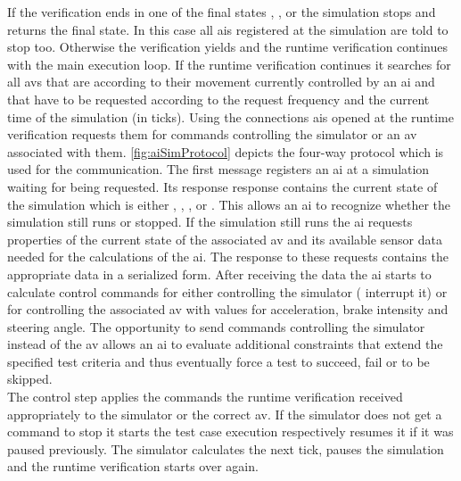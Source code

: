 If the verification ends in one of the final states , ,  or  the simulation stops and returns the final state.
In this case all \glspl{ai} registered at the simulation are told to stop too.
Otherwise the verification yields  and the runtime verification continues with the main execution loop.
If the runtime verification continues it searches for all \glspl{av} that are according to their movement currently controlled by an \gls{ai} and that have to be requested according to the request frequency and the current time of the simulation (in ticks).
Using the connections \glspl{ai} opened at \drivebuild{} the runtime verification requests them for commands controlling the simulator or an \gls{av} associated with them.
\autoref{fig:aiSimProtocol} depicts the four-way protocol which is used for the communication.
The first message registers an \gls{ai} at a simulation waiting for being requested.
Its response response contains the current state of the simulation which is either , , ,  or .
This allows an \gls{ai} to recognize whether the simulation still runs or stopped.
If the simulation still runs the \gls{ai} requests properties of the current state of the associated \gls{av} and its available sensor data needed for the calculations of the \gls{ai}.
The response to these requests contains the appropriate data in a serialized form.
After receiving the data the \gls{ai} starts to calculate control commands for either controlling the simulator (\eg{} interrupt it) or for controlling the associated \gls{av} with values for acceleration, brake intensity and steering angle.
The opportunity to send commands controlling the simulator instead of the \gls{av} allows an \gls{ai} to evaluate additional constraints that extend the specified test criteria and thus eventually force a test to succeed, fail or to be skipped.\\
The control step applies the commands the runtime verification received appropriately to the simulator or the correct \gls{av}.
If the simulator does not get a command to stop it starts the test case execution respectively resumes it if it was paused previously.
The simulator calculates the next tick, pauses the simulation and the runtime verification starts over again.

